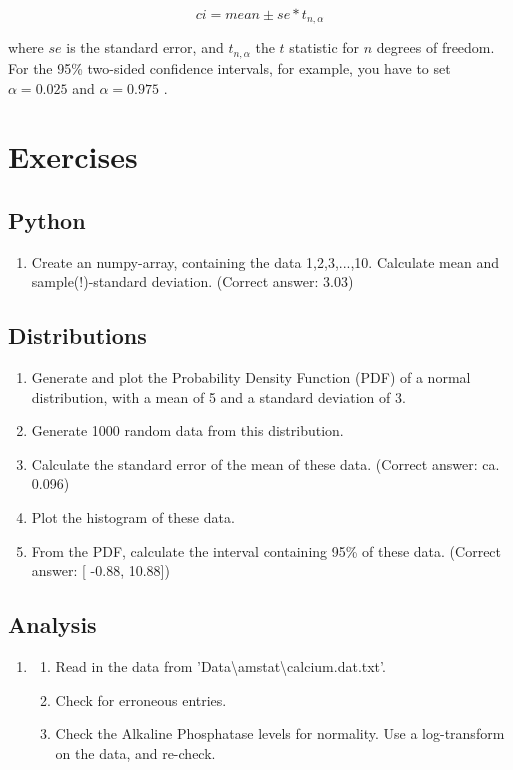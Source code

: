 \begin{equation}
  ci = mean \pm se * t_{n,\alpha}
\end{equation}\label{eq:ci}

where $se$ is the standard error, and $t_{n,\alpha}$ the $t$ statistic for $n$ degrees of freedom. For the 95\% two-sided confidence intervals, for example, you have to set $\alpha=0.025$ and $\alpha=0.975$ .

\section{Exercises}

\subsection{Python}
\begin{enumerate}
  \item Create an numpy-array, containing the data 1,2,3,...,10. Calculate mean and sample(!)-standard deviation.
    (Correct answer: 3.03)
\end{enumerate}

\subsection{Distributions}


\begin{enumerate}
  \item  Generate and plot the Probability Density Function (PDF) of a normal distribution, with a mean of 5 and a standard deviation of 3.
  \item  Generate 1000 random data from this distribution.
  \item  Calculate the standard error of the mean of these data.
    (Correct answer: ca. 0.096)

  \item  Plot the histogram of these data.
  \item  From the PDF, calculate the interval containing 95\% of these data.
    (Correct answer: [ -0.88, 10.88])
\end{enumerate}

\subsection{Analysis}
\begin{enumerate}
  \item
  \begin{enumerate}
    \item Read in the data from 'Data\textbackslash amstat\textbackslash calcium.dat.txt'.
    \item Check for erroneous entries.
    \item Check the Alkaline Phosphatase levels for normality. Use a log-transform on the data, and re-check.
  \end{enumerate}

\end{enumerate}

